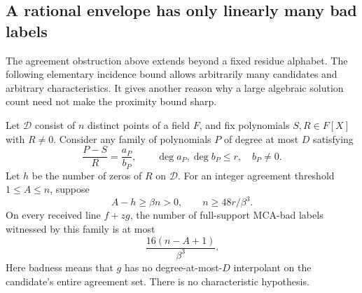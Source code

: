 \subsection{A rational envelope has only linearly many bad labels}
\label{sec:rational-envelope}

The agreement obstruction above extends beyond a fixed residue alphabet.
The following elementary incidence bound allows arbitrarily many candidates
and arbitrary characteristics. It gives another reason why a large
algebraic solution count need not make the proximity bound sharp.

\begin{proposition}
\label{prop:rational-envelope}
Let $\mathcal D$ consist of $n$ distinct points of a field $F$, and fix
polynomials $S,R\in F[X]$ with $R\ne0$. Consider any family of polynomials
$P$ of degree at most $D$ satisfying
\[
 \frac{P-S}{R}=\frac{a_P}{b_P},\qquad
 \deg a_P,\deg b_P\le r,\quad b_P\ne0.
\]
Let $h$ be the number of zeros of $R$ on $\mathcal D$. For an integer
agreement threshold $1\le A\le n$, suppose
\[
 A-h\ge\beta n>0,\qquad n\ge48r/\beta^3.
\]
On every received line $f+zg$, the number of full-support MCA-bad labels
witnessed by this family is at most
\[
 \frac{16(n-A+1)}{\beta^3}.
\]
Here badness means that $g$ has no degree-at-most-$D$ interpolant on the
candidate's entire agreement set. There is no characteristic hypothesis.
\end{proposition}
